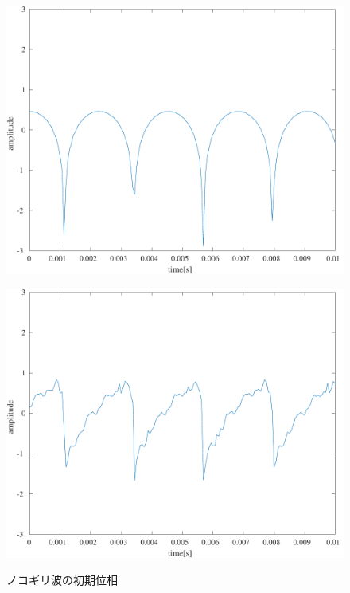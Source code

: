 \begin{figure}[H]
\begin{minipage}{.24\textwidth}
        \label{fig:実験結果ノコギリ波_p4PI}
    \end{minipage}
    \begin{minipage}{.24\textwidth}
        \centering
        \includegraphics[keepaspectratio,width=\textwidth]{../../Figures/03_23.pdf}
        \label{fig:実験結果ノコギリ波_p2PI}
    \end{minipage}
    \begin{minipage}{.24\textwidth}
        \centering
        \includegraphics[keepaspectratio,width=\textwidth]{../../Figures/03_24.pdf}
        \label{fig:実験結果ノコギリ波_rand}
    \end{minipage}
    \caption{ノコギリ波の初期位相}
    \label{fig:ノコギリ波の初期位相}
\end{figure}
